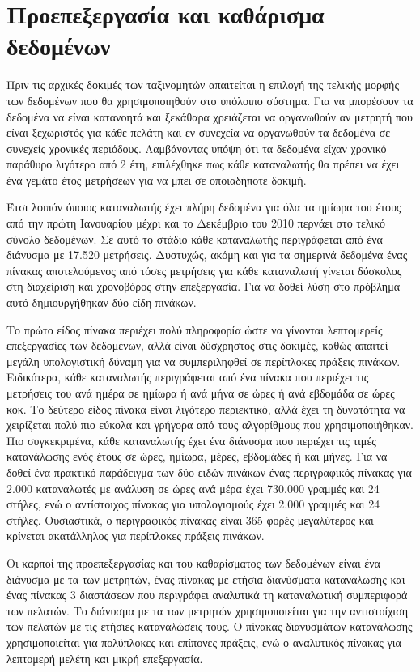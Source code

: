\section{Προεπεξεργασία και καθάρισμα δεδομένων}
Πριν τις αρχικές δοκιμές των ταξινομητών απαιτείται η επιλογή της τελικής μορφής των δεδομένων που θα χρησιμοποιηθούν στο υπόλοιπο σύστημα. Για να μπορέσουν τα δεδομένα να είναι κατανοητά και ξεκάθαρα χρειάζεται να οργανωθούν αν  μετρητή που είναι ξεχωριστός για κάθε πελάτη και εν συνεχεία να οργανωθούν τα δεδομένα σε συνεχείς χρονικές περιόδους. Λαμβάνοντας υπόψη ότι τα δεδομένα είχαν χρονικό παράθυρο λιγότερο από 2 έτη, επιλέχθηκε πως κάθε καταναλωτής θα πρέπει να έχει ένα γεμάτο έτος μετρήσεων για να μπει σε οποιαδήποτε δοκιμή.\par
Έτσι λοιπόν όποιος καταναλωτής έχει πλήρη δεδομένα για όλα τα ημίωρα του έτους από την πρώτη Ιανουαρίου μέχρι και το Δεκέμβριο του 2010 περνάει στο τελικό σύνολο δεδομένων. Σε αυτό το στάδιο κάθε καταναλωτής περιγράφεται από ένα διάνυσμα με 17.520 μετρήσεις. Δυστυχώς, ακόμη και για τα σημερινά δεδομένα ένας πίνακας αποτελούμενος από τόσες μετρήσεις για κάθε καταναλωτή γίνεται δύσκολος στη διαχείριση και χρονοβόρος στην επεξεργασία. Για να δοθεί λύση στο πρόβλημα αυτό δημιουργήθηκαν δύο είδη πινάκων.\par
Το πρώτο είδος πίνακα περιέχει πολύ πληροφορία ώστε να γίνονται λεπτομερείς επεξεργασίες των δεδομένων, αλλά είναι δύσχρηστος στις δοκιμές, καθώς απαιτεί μεγάλη υπολογιστική δύναμη για να συμπεριληφθεί σε περίπλοκες πράξεις πινάκων. Ειδικότερα, κάθε καταναλωτής περιγράφεται από ένα πίνακα που περιέχει τις μετρήσεις του ανά ημέρα σε ημίωρα ή ανά μήνα σε ώρες ή ανά εβδομάδα σε ώρες κοκ. Το δεύτερο είδος πίνακα είναι λιγότερο περιεκτικό, αλλά έχει τη δυνατότητα να χειρίζεται πολύ πιο εύκολα και γρήγορα από τους αλγορίθμους που χρησιμοποιήθηκαν. Πιο συγκεκριμένα, κάθε καταναλωτής έχει ένα διάνυσμα που περιέχει τις τιμές κατανάλωσης ενός έτους σε ώρες, ημίωρα, μέρες, εβδομάδες ή και μήνες. Για να δοθεί ένα πρακτικό παράδειγμα των δύο ειδών πινάκων ένας περιγραφικός πίνακας για 2.000 καταναλωτές με ανάλυση σε ώρες ανά μέρα έχει 730.000 γραμμές και 24 στήλες, ενώ ο αντίστοιχος πίνακας για υπολογισμούς έχει 2.000 γραμμές και 24 στήλες. Ουσιαστικά, ο περιγραφικός πίνακας είναι 365 φορές μεγαλύτερος και κρίνεται ακατάλληλος για περίπλοκες πράξεις πινάκων.\par
Οι καρποί της προεπεξεργασίας και του καθαρίσματος των δεδομένων είναι ένα διάνυσμα με τα  των μετρητών, ένας πίνακας με ετήσια διανύσματα κατανάλωσης και ένας πίνακας 3 διαστάσεων που περιγράφει αναλυτικά τη καταναλωτική συμπεριφορά των πελατών. Το διάνυσμα με τα  των μετρητών χρησιμοποιείται για την αντιστοίχιση των πελατών με τις ετήσιες καταναλώσεις τους. Ο πίνακας διανυσμάτων κατανάλωσης χρησιμοποιείται για πολύπλοκες και επίπονες πράξεις, ενώ ο αναλυτικός πίνακας για λεπτομερή μελέτη και μικρή επεξεργασία.
